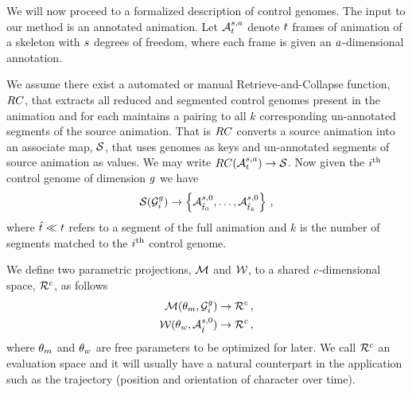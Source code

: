We will now proceed to a formalized description of control genomes. The input to our method is an annotated animation. Let $\mathcal{A}^{s,a}_t$ denote $t$ frames of animation of a skeleton with $s$ degrees of freedom, where each frame is given an $a$-dimensional annotation. 

We assume there exist a automated or manual Retrieve-and-Collapse function, ${RC}$,  that extracts all reduced and segmented control genomes present in the animation and for each maintains a pairing to all $k$ corresponding un-annotated segments of the source animation. That is ${RC}$ converts a source animation into an associate map, $\mathcal{S}$, that uses genomes as keys and un-annotated segments of source animation as values. We may write ${RC}(\mathcal{A}^{s,a}_t) \rightarrow \mathcal{S}$. Now given the $i ^{\text{th}}$ control genome of dimension $g$ we have
\begin{equation}
 \mathcal{S}(\mathcal{G}^g_i) \rightarrow \left\{\mathcal{A}^{s,0}_{{\hat{t}}_0},\ldots,\mathcal{A}^{s,0}_{{\hat{t}}_k}\right\}   \,,
\end{equation}
where ${\hat{t}}\ll t$ refers to a segment of the full animation and $k$ is the number of segments matched to the $i ^{\text{th}}$ control genome.

We define two parametric projections, $\mathcal{M}$ and $\mathcal{W}$, to a shared $c$-dimensional space, $\mathcal{R}^{c}$, as follows
\begin{align}
\mathcal{M}(\theta_{m},\mathcal{G}_i^{g}) 
&\rightarrow 
\mathcal{R}^{c}    \,,
\\
\mathcal{W}(\theta_{w},\mathcal{A}_{{\hat{t}}}^{s,0})
&\rightarrow
\mathcal{R}^{c} \,,
\end{align}
where $\theta_{m}$ and $\theta_{w}$ are free parameters to be optimized for later. We call $\mathcal{R}^{c}$ an evaluation space and it will usually have a natural counterpart in the application such as the trajectory (position and orientation of character over time).

